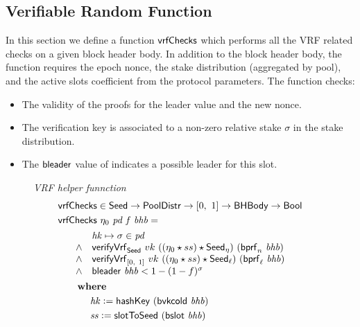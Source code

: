 \subsection{Verifiable Random Function}
\label{sec:verif-rand-funct}

In this section we define a function $\mathsf{vrfChecks}$ which performs all the VRF related checks
on a given block header body.
In addition to the block header body, the function requires the epoch nonce,
the stake distribution (aggregated by pool), and the active slots coefficient from the protocol
parameters. The function checks:

\begin{itemize}
\item The validity of the proofs for the leader value and the new nonce.
\item The verification key is associated to a non-zero relative stake
  $\sigma$ in the stake distribution.
\item The $\mathsf{bleader}$ value of  indicates a possible leader for
  this slot.
\end{itemize}

\begin{figure}
  \emph{VRF helper funnction}
  \begin{align*}
      & \mathsf{vrfChecks} \in \mathsf{Seed} \to \mathsf{PoolDistr} \to [0,~1] \to \mathsf{BHBody} \to \mathsf{Bool} \\
      & \mathsf{vrfChecks}~\eta_0~\mathit{pd}~\mathit{f}~\mathit{bhb} = \\
      & \begin{array}{cl}
        ~~~~ & \mathit{hk}\mapsto \sigma\in\mathit{pd} \\
        ~~~~ \land &
             \mathsf{verifyVrf}_{\mathsf{Seed}} ~ vk ~ ((\eta_0\star ss)\star\mathsf{Seed}_\eta) ~(\mathsf{bprf}_{n}~\mathit{bhb}) \\
        ~~~~ \land &
             \mathsf{verifyVrf}_{[0,~1]} ~ vk ~ ((\eta_0\star ss)\star\mathsf{Seed}_\ell) ~(\mathsf{bprf}_{\ell}~\mathit{bhb}) \\
        ~~~~ \land &
             \mathsf{bleader}~\mathit{bhb} < 1 - (1 - f)^{\sigma} \\
      \end{array} \\
      & ~~~~~ ~ \mathbf{where}~ ~  \\
      & ~~~~~~~~~~\mathit{hk} \mathrel{\mathop:}= \mathsf{hashKey}~ \mathit{(\mathsf{bvkcold}~\mathit{b}hb)} \\
      & ~~~~~~~~~~\mathit{ss} \mathrel{\mathop:}= \mathsf{slotToSeed}~ \mathit{(\mathsf{bslot}~\mathit{bhb})} \\
  \end{align*}
  \label{fig:vrf-checks}
\end{figure}

